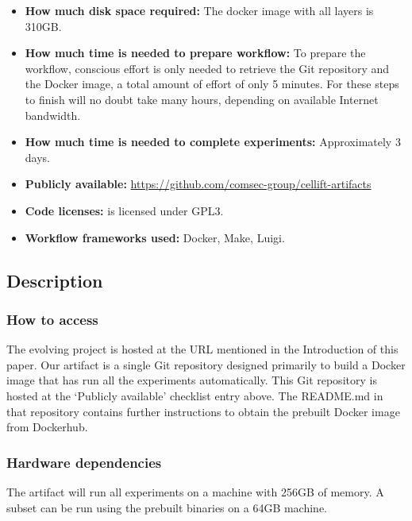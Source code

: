 \documentclass[letterpaper,twocolumn,10pt]{article}
\begin{document}
{\begin{itemize}
  \item {\bf How much disk space required: } The docker image with all layers is 310GB.
  \item {\bf How much time is needed to prepare workflow: } To prepare the workflow, conscious effort is only needed to retrieve the Git repository and the Docker image, a total amount of effort of only 5 minutes. For these steps to finish will no doubt take many hours, depending on available Internet bandwidth.
  \item {\bf How much time is needed to complete experiments: } Approximately 3 days. 
  \item {\bf Publicly available: } \url{https://github.com/comsec-group/cellift-artifacts} 
  \item {\bf Code licenses: } \ourname is licensed under GPL3. 
  \item {\bf Workflow frameworks used: } Docker, Make, Luigi. 
\end{itemize}

\subsection{Description}


\subsubsection{How to access}

The evolving project is hosted at the URL mentioned in the Introduction
of this paper. Our artifact is a single Git repository designed primarily to
build a Docker image that has run all the experiments automatically. This
Git repository is hosted at the `Publicly available' checklist entry above.
The README.md in that repository contains further instructions to obtain the
prebuilt Docker image from Dockerhub.

\subsubsection{Hardware dependencies}

The artifact will run all experiments on a machine with 256GB of memory. A subset can be run using the prebuilt binaries on a 64GB machine.

}
\end{document}

